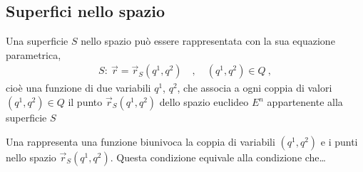 \documentclass[letterpaper,10pt,italian]{jupyterBook}
\begin{document}
\subsection{Superfici nello spazio}
\label{\detokenize{ch/vector-calculus/geometry:superfici-nello-spazio}}\label{\detokenize{ch/vector-calculus/geometry:vector-calculus-geometry-surfaces}}
\sphinxAtStartPar
Una superficie \(S\) nello spazio può essere rappresentata con la sua equazione parametrica,
\begin{equation*}
\begin{split}S: \ \vec{r} = \vec{r}_{S}(q^1,q^2) \quad , \quad (q^1,q^2) \in Q \ ,\end{split}
\end{equation*}
\sphinxAtStartPar
cioè una funzione di due variabili \(q^1\), \(q^2\), che associa a ogni coppia di valori \((q^1, q^2) \in Q\) il punto \(\vec{r}_S(q^1, q^2)\) dello spazio euclideo \(E^n\) appartenente alla superficie \(S\)

\sphinxAtStartPar
Una  rappresenta una funzione biunivoca la coppia di variabili \((q^1, q^2)\) e i punti nello spazio \(\vec{r}_{S}(q^1, q^2)\). Questa condizione equivale alla condizione che…
\end{document}
